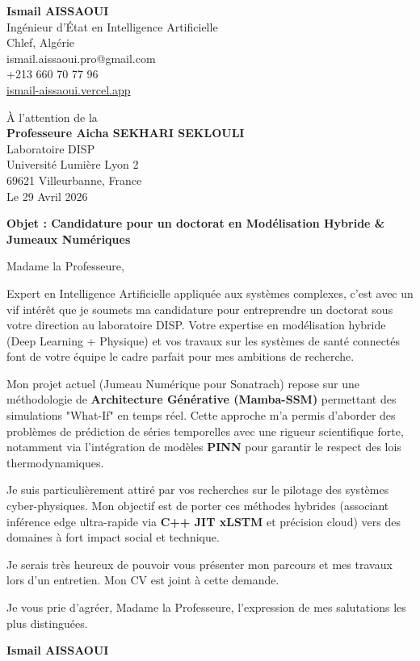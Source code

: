 \documentclass[a4paper,12pt]{article}
\begin{document}
\begin{flushleft}
    \textbf{Ismail AISSAOUI} \\
    Ingénieur d'État en Intelligence Artificielle \\
    Chlef, Algérie \\
    ismail.aissaoui.pro@gmail.com \\
    +213 660 70 77 96 \\
    \href{https://ismail-aissaoui.vercel.app}{ismail-aissaoui.vercel.app}
\end{flushleft}

\begin{flushright}
    À l'attention de la \\
    \textbf{Professeure Aicha SEKHARI SEKLOULI} \\
    Laboratoire DISP \\
    Université Lumière Lyon 2 \\
    69621 Villeurbanne, France \\
    \medskip
    Le 29 Avril 2026
\end{flushright}

\bigskip

\noindent \textbf{Objet : Candidature pour un doctorat en Modélisation Hybride \& Jumeaux Numériques}

\bigskip

Madame la Professeure,

Expert en Intelligence Artificielle appliquée aux systèmes complexes, c'est avec un vif intérêt que je soumets ma candidature pour entreprendre un doctorat sous votre direction au laboratoire DISP. Votre expertise en modélisation hybride (Deep Learning + Physique) et vos travaux sur les systèmes de santé connectés font de votre équipe le cadre parfait pour mes ambitions de recherche.

Mon projet actuel (Jumeau Numérique pour Sonatrach) repose sur une méthodologie de \textbf{Architecture Générative (Mamba-SSM)} permettant des simulations "What-If" en temps réel. Cette approche m'a permis d'aborder des problèmes de prédiction de séries temporelles avec une rigueur scientifique forte, notamment via l'intégration de modèles \textbf{PINN} pour garantir le respect des lois thermodynamiques.

Je suis particulièrement attiré par vos recherches sur le pilotage des systèmes cyber-physiques. Mon objectif est de porter ces méthodes hybrides (associant inférence edge ultra-rapide via \textbf{C++ JIT xLSTM} et précision cloud) vers des domaines à fort impact social et technique.

Je serais très heureux de pouvoir vous présenter mon parcours et mes travaux lors d'un entretien. Mon CV est joint à cette demande.

Je vous prie d'agréer, Madame la Professeure, l'expression de mes salutations les plus distinguées.

\bigskip

\begin{flushright}
    \textbf{Ismail AISSAOUI}
\end{flushright}
\end{document}
